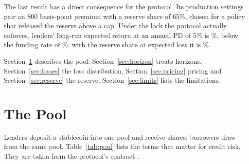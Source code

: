 \documentclass[11pt]{article}
\theoremstyle{plain}
\theoremstyle{definition}
\begin{document}
The last result has a direct consequence for the protocol. Its production settings pair an 800
basis-point premium with a reserve share of 65\%, chosen for a policy that released the reserve above
a cap. Under the lock the protocol actually enforces, lenders' long-run expected return at an annual
PD of 5\% is \LongRunLockedFive\%, below the funding rate of \Effr\%; with the reserve share at
expected loss it is \LongRunAtElFive\%.

Section~\ref{sec:pool} describes the pool. Section~\ref{sec:horizon} treats horizons,
Section~\ref{sec:losses} the loss distribution, Section~\ref{sec:pricing} pricing and
Section~\ref{sec:reserve} the reserve. Section~\ref{sec:limits} lists the limitations.

\section{The Pool}\label{sec:pool}

Lenders deposit a stablecoin into one pool and receive shares; borrowers draw from the same pool.
Table~\ref{tab:pool} lists the terms that matter for credit risk. They are taken from the protocol's
contract \citep{microcredit2026contract}.
\end{document}
